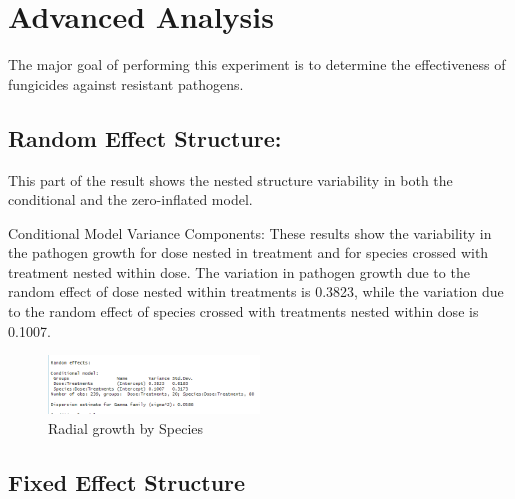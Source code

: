 \documentclass[
  10pt,
  letterpaper,
  twocolumn]{article}
\begin{document}
\hypertarget{advanced-analysis}{%
\section{Advanced Analysis}\label{advanced-analysis}}

\vspace{-1em}

The major goal of performing this experiment is to determine the
effectiveness of fungicides against resistant pathogens.

\hypertarget{random-effect-structure}{%
\subsection{Random Effect Structure:}\label{random-effect-structure}}

\vspace{-1em}

This part of the result shows the nested structure variability in both
the conditional and the zero-inflated model.

Conditional Model Variance Components: These results show the
variability in the pathogen growth for dose nested in treatment and for
species crossed with treatment nested within dose. The variation in
pathogen growth due to the random effect of dose nested within
treatments is 0.3823, while the variation due to the random effect of
species crossed with treatments nested within dose is 0.1007.

\begin{figure}

{\centering \includegraphics[width=0.5\textwidth,height=\textheight]{Fig10.png}

}

\caption{Radial growth by Species}

\end{figure}

\hypertarget{fixed-effect-structure}{%
\subsection{Fixed Effect Structure}\label{fixed-effect-structure}}

\vspace{-1em}
\end{document}
